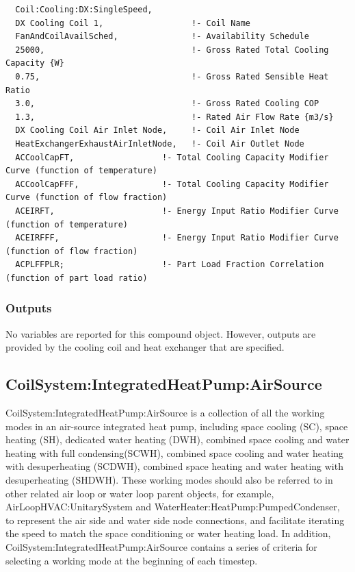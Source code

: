 \begin{lstlisting}
  Coil:Cooling:DX:SingleSpeed,
  DX Cooling Coil 1,                  !- Coil Name
  FanAndCoilAvailSched,               !- Availability Schedule
  25000,                              !- Gross Rated Total Cooling Capacity {W}
  0.75,                               !- Gross Rated Sensible Heat Ratio
  3.0,                                !- Gross Rated Cooling COP
  1.3,                                !- Rated Air Flow Rate {m3/s}
  DX Cooling Coil Air Inlet Node,     !- Coil Air Inlet Node
  HeatExchangerExhaustAirInletNode,   !- Coil Air Outlet Node
  ACCoolCapFT,                  !- Total Cooling Capacity Modifier Curve (function of temperature)
  ACCoolCapFFF,                 !- Total Cooling Capacity Modifier Curve (function of flow fraction)
  ACEIRFT,                      !- Energy Input Ratio Modifier Curve (function of temperature)
  ACEIRFFF,                     !- Energy Input Ratio Modifier Curve (function of flow fraction)
  ACPLFFPLR;                    !- Part Load Fraction Correlation (function of part load ratio)
\end{lstlisting}

\subsubsection{Outputs}\label{outputs-21}

No variables are reported for this compound object. However, outputs are provided by the cooling coil and heat exchanger that are specified.

\subsection{CoilSystem:IntegratedHeatPump:AirSource}\label{ASIHPIO}

CoilSystem:IntegratedHeatPump:AirSource is a collection of all the working modes in an air-source integrated heat pump, including space cooling (SC), space heating (SH), dedicated water heating (DWH), combined space cooling and water heating with full condensing(SCWH), combined space cooling and water heating with desuperheating (SCDWH), combined space heating and water heating with desuperheating (SHDWH). These working modes should also be referred to in other related air loop or water loop parent objects, for example, AirLoopHVAC:UnitarySystem and WaterHeater:HeatPump:PumpedCondenser, to represent the air side and water side node connections, and facilitate iterating the speed to match the space conditioning or water heating load. In addition, CoilSystem:IntegratedHeatPump:AirSource contains a series of criteria for selecting a working mode at the beginning of each timestep. 

